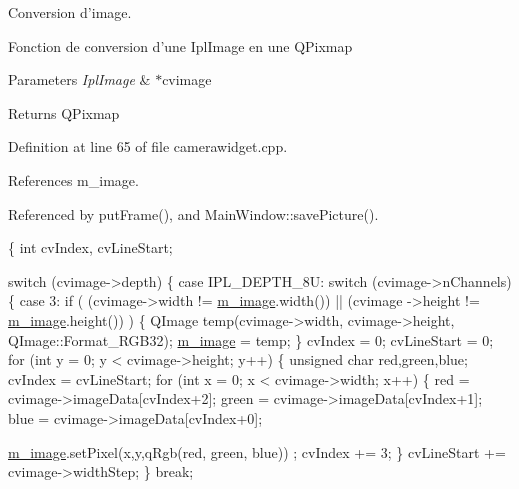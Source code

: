 Conversion d'image. 

Fonction de conversion d'une Ipl\-Image en une Q\-Pixmap 
\begin{DoxyParams}{Parameters}
{\em Ipl\-Image} & $\ast$cvimage \\
\hline
\end{DoxyParams}
\begin{DoxyReturn}{Returns}
Q\-Pixmap 
\end{DoxyReturn}


Definition at line 65 of file camerawidget.\-cpp.



References m\-\_\-image.



Referenced by put\-Frame(), and Main\-Window\-::save\-Picture().


\begin{DoxyCode}
                                                \{
    \textcolor{keywordtype}{int} cvIndex, cvLineStart;

    \textcolor{keywordflow}{switch} (cvimage->depth) \{
        \textcolor{keywordflow}{case} IPL\_DEPTH\_8U:
            \textcolor{keywordflow}{switch} (cvimage->nChannels) \{
                \textcolor{keywordflow}{case} 3:
                    \textcolor{keywordflow}{if} ( (cvimage->width != \hyperlink{classCameraWidget_a953550f36cf3dd234dd33e36f0e85e95}{m\_image}.width()) || (cvimage
      ->height != \hyperlink{classCameraWidget_a953550f36cf3dd234dd33e36f0e85e95}{m\_image}.height()) ) \{
                        QImage temp(cvimage->width, cvimage->height, 
      QImage::Format\_RGB32);
                        \hyperlink{classCameraWidget_a953550f36cf3dd234dd33e36f0e85e95}{m\_image} = temp;
                    \}
                    cvIndex = 0; cvLineStart = 0;
                    \textcolor{keywordflow}{for} (\textcolor{keywordtype}{int} y = 0; y < cvimage->height; y++) \{
                        \textcolor{keywordtype}{unsigned} \textcolor{keywordtype}{char} red,green,blue;
                        cvIndex = cvLineStart;
                        \textcolor{keywordflow}{for} (\textcolor{keywordtype}{int} x = 0; x < cvimage->width; x++) \{
                            red = cvimage->imageData[cvIndex+2];
                            green = cvimage->imageData[cvIndex+1];
                            blue = cvimage->imageData[cvIndex+0];

                            \hyperlink{classCameraWidget_a953550f36cf3dd234dd33e36f0e85e95}{m\_image}.setPixel(x,y,qRgb(red, green, blue))
      ;
                            cvIndex += 3;
                        \}
                        cvLineStart += cvimage->widthStep;
                    \}
                    \textcolor{keywordflow}{break};


\end{DoxyCode}
